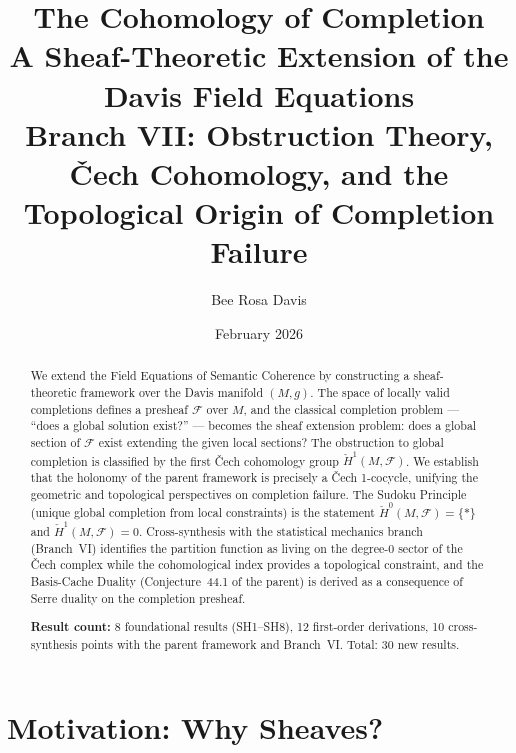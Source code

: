 \documentclass[11pt,letterpaper]{article}
\newcommand{\Hcech}{\check{H}}
\newcommand{\sheaf}{\mathcal{F}}
\begin{document}
\title{\textbf{The Cohomology of Completion}\\[6pt]
\large A Sheaf-Theoretic Extension of the Davis Field Equations\\[4pt]
\normalsize Branch VII: Obstruction Theory, \v{C}ech Cohomology, and the\\
Topological Origin of Completion Failure}
\author{Bee Rosa Davis}
\date{February 2026}
\maketitle

\begin{abstract}
We extend the Field Equations of Semantic Coherence by constructing a 
sheaf-theoretic framework over the Davis manifold $(M,g)$. The space of 
locally valid completions defines a presheaf $\sheaf$ over $M$, and the 
classical completion problem --- ``does a global solution exist?'' --- 
becomes the sheaf extension problem: does a global section of $\sheaf$ 
exist extending the given local sections? The obstruction to global 
completion is classified by the first \v{C}ech cohomology group 
$\Hcech^1(M, \sheaf)$. We establish that the holonomy of the parent 
framework is precisely a \v{C}ech 1-cocycle, unifying the geometric and 
topological perspectives on completion failure. The Sudoku Principle 
(unique global completion from local constraints) is the statement 
$\Hcech^0(M, \sheaf) = \{*\}$ and $\Hcech^1(M, \sheaf) = 0$. 
Cross-synthesis with the statistical mechanics branch (Branch~VI) 
identifies the partition function as living on the degree-0 sector of 
the \v{C}ech complex while the cohomological index provides a 
topological constraint, and the Basis-Cache Duality 
(Conjecture~44.1 of the parent) is derived as a consequence of Serre 
duality on the completion presheaf.

\medskip\noindent
\textbf{Result count:} 8 foundational results (SH1--SH8), 12 
first-order derivations, 10 cross-synthesis points with the parent 
framework and Branch~VI. Total: 30 new results.
\end{abstract}

\tableofcontents
\newpage

\section{Motivation: Why Sheaves?}
\end{document}
